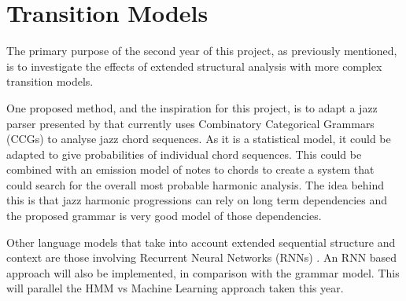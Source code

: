 \documentclass[bsc,singlespacing,parskip,deptreport,twoside,frontabs]{infthesis}
\begin{document}




\section{Transition Models}

The primary purpose of the second year of this project, as previously mentioned, is to investigate the effects of extended structural analysis with more complex transition models.

One proposed method, and the inspiration for this project, is to adapt a jazz parser presented by \cite{ccg} that currently uses Combinatory Categorical Grammars (CCGs) to analyse jazz chord sequences. As it is a statistical model, it could be adapted to give probabilities of individual chord sequences. This could be combined with an emission model of notes to chords to create a system that could search for the overall most probable harmonic analysis. The idea behind this is that jazz harmonic progressions can rely on long term dependencies and the proposed grammar is very good model of those dependencies. 

Other language models that take into account extended sequential structure and context are those involving Recurrent Neural Networks (RNNs) \cite[]{rnn}. An RNN based approach will also be implemented, in comparison with the grammar model. This will parallel the HMM vs Machine Learning approach taken this year.
\end{document}
